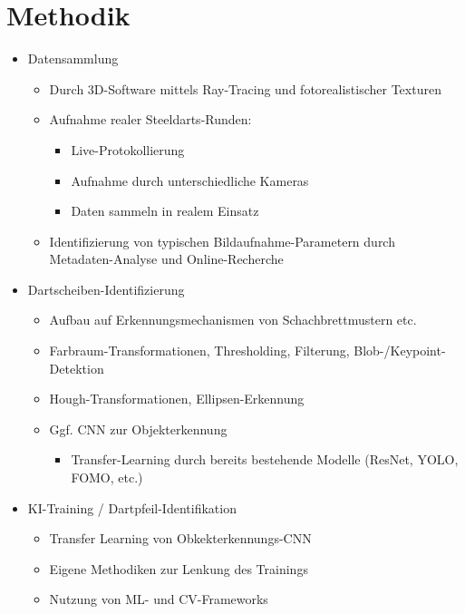 \section{Methodik}
\label{sec:methodik}

\begin{itemize}
    \item Datensammlung
    \begin{itemize}
        \raggedright
        \item Durch 3D-Software mittels Ray-Tracing und fotorealistischer Texturen
        \item Aufnahme realer Steeldarts-Runden:
        \begin{itemize}
            \item Live-Protokollierung
            \item Aufnahme durch unterschiedliche Kameras
            \item Daten sammeln in realem Einsatz
        \end{itemize}
        \item Identifizierung von typischen Bildaufnahme-Parametern durch Metadaten-Analyse und Online-Recherche
    \end{itemize}

    \item Dartscheiben-Identifizierung
    \begin{itemize}
        \raggedright
        \item Aufbau auf Erkennungsmechanismen von Schachbrettmustern etc.
        \item Farbraum-Transformationen, Thresholding, Filterung, Blob-/Keypoint-Detektion
        \item Hough-Transformationen, Ellipsen-Erkennung
        \item Ggf. CNN zur Objekterkennung
        \begin{itemize}
            \item Transfer-Learning durch bereits bestehende Modelle (ResNet, YOLO, FOMO, etc.)
        \end{itemize}
    \end{itemize}

    \item KI-Training / Dartpfeil-Identifikation
    \begin{itemize}
        \item Transfer Learning von Obkekterkennungs-CNN
        \item Eigene Methodiken zur Lenkung des Trainings
        \item Nutzung von ML- und CV-Frameworks
    \end{itemize}


\end{itemize}

